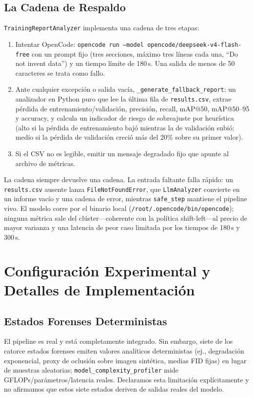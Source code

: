 \documentclass[10pt,twocolumn,letterpaper]{article}
\begin{document}
\subsection{La Cadena de Respaldo}
\texttt{TrainingReportAnalyzer} implementa una cadena de tres etapas:
\begin{enumerate}
    \item Intentar OpenCode: \texttt{opencode run --model opencode/deepseek-v4-flash-free} con un prompt fijo (tres secciones, máximo tres líneas cada una, ``Do not invent data'') y un tiempo límite de 180\,s. Una salida de menos de 50 caracteres se trata como fallo.
    \item Ante cualquier excepción o salida vacía, \texttt{\_generate\_fallback\_report}: un analizador en Python puro que lee la última fila de \texttt{results.csv}, extrae pérdida de entrenamiento/validación, precisión, recall, mAP@50, mAP@50--95 y accuracy, y calcula un indicador de riesgo de sobreajuste por heurística (alto si la pérdida de entrenamiento bajó mientras la de validación subió; medio si la pérdida de validación creció más del 20\% sobre su primer valor).
    \item Si el CSV no es legible, emitir un mensaje degradado fijo que apunte al archivo de métricas.
\end{enumerate}
La cadena siempre devuelve una cadena. La entrada faltante falla rápido: un \texttt{results.csv} ausente lanza \texttt{FileNotFoundError}, que \texttt{LlmAnalyzer} convierte en un informe vacío y una cadena de error, mientras \texttt{safe\_step} mantiene el pipeline vivo. El modelo corre por el binario local (\texttt{/root/.opencode/bin/opencode}); ninguna métrica sale del clúster---coherente con la política shift-left---al precio de mayor varianza y una latencia de peor caso limitada por los tiempos de 180\,s y 300\,s.

\section{Configuración Experimental y Detalles de Implementación}
\subsection{Estados Forenses Deterministas}
El pipeline es real y está completamente integrado. Sin embargo, siete de los catorce estados forenses emiten valores analíticos deterministas (ej., degradación exponencial, proxy de oclusión sobre imagen sintética, medias FID fijas) en lugar de muestras aleatorias; \texttt{model\_complexity\_profiler} mide GFLOPs/parámetros/latencia reales. Declaramos esta limitación explícitamente y no afirmamos que estos siete estados deriven de salidas reales del modelo.
\end{document}

